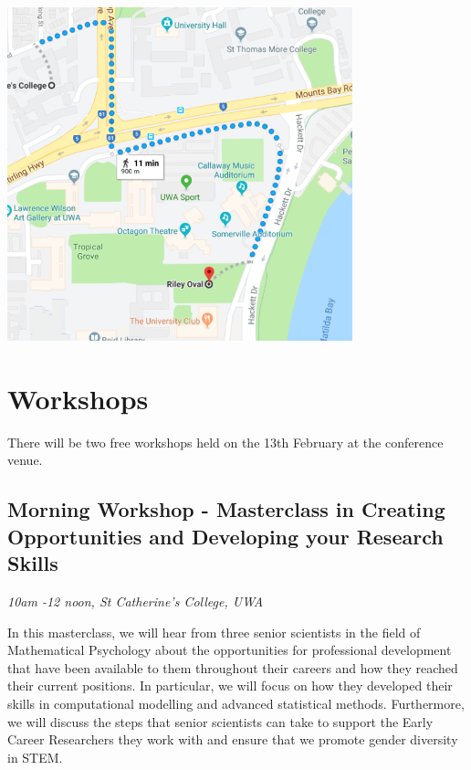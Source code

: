\documentclass[]{article}
\begin{document}
\begin{center}
\vspace{2 cm}
\includegraphics[width=10cm]{images/Soccer}
\vspace{2 cm}
\end{center}\newpage

\section{Workshops}\label{workshops}

There will be two free workshops held on the 13th February at the
conference venue.

\subsection{Morning Workshop - Masterclass in Creating Opportunities and
Developing your Research
Skills}\label{morning-workshop---masterclass-in-creating-opportunities-and-developing-your-research-skills}

\emph{10am -12 noon, St Catherine's College, UWA}

In this masterclass, we will hear from three senior scientists in the
field of Mathematical Psychology about the opportunities for
professional development that have been available to them throughout
their careers and how they reached their current positions. In
particular, we will focus on how they developed their skills in
computational modelling and advanced statistical methods. Furthermore,
we will discuss the steps that senior scientists can take to support the
Early Career Researchers they work with and ensure that we promote
gender diversity in STEM.
\end{document}
